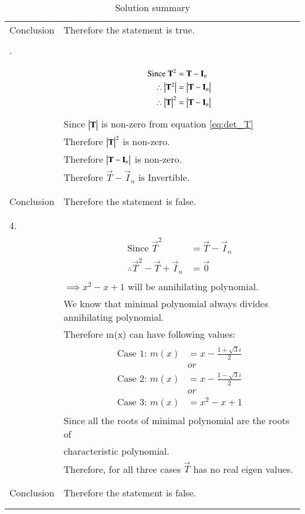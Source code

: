 \documentclass[journal,12pt]{IEEEtran}
\begin{document}
\begin{longtable}{|l|l|}
Conclusion&Therefore the statement is true.\\
&\\
\hline
\pagebreak
\hline
3.&\\
&\\
&\parbox{10cm}{\begin{align}
    \mbox{Since }\mathbf{T}^2&=\mathbf{T}-\mathbf{I}_{n}\\
    \therefore\begin{vmatrix}\mathbf{T}^2\end{vmatrix}&=\begin{vmatrix}\mathbf{T}-\mathbf{I}_{n}\end{vmatrix}\\
    \therefore\begin{vmatrix}\mathbf{T}\end{vmatrix}^2&=\begin{vmatrix}\mathbf{T}-\mathbf{I}_{n}\end{vmatrix}
\end{align}}\\
&Since $\begin{vmatrix}\mathbf{T}\end{vmatrix}$ is non-zero from equation \eqref{eq:det_T}\\
&Therefore $\begin{vmatrix}\mathbf{T}\end{vmatrix}^2$ is non-zero.\\
&Therefore $\begin{vmatrix}\mathbf{T}-\mathbf{I}_{n}\end{vmatrix}$ is non-zero.\\
&Therefore $\vec{T}-\vec{I}_{n}$ is Invertible.\\
&\\
\hline
&\\
Conclusion&Therefore the statement is false.\\
&\\
\hline
&\\
4.&\\
&\parbox{6cm}{\begin{align*}
    \mbox{Since }\vec{T}^2&=\vec{T}-\vec{I}_{n}\\
    \therefore\vec{T}^2-\vec{T}+\vec{I}_{n}&=\vec{0}
\end{align*}}\\
&$\implies x^2-x+1$ will be annihilating polynomial.\\
&We know that minimal polynomial always divides annihilating polynomial.\\
&Therefore m(x) can have following values:\\
&\parbox{6cm}{\begin{align*}
    \mbox{Case 1: }m(x)&=x-\frac{1+\sqrt{3}i}{2}\\
    &or\\
    \mbox{Case 2: }m(x)&=x-\frac{1-\sqrt{3}i}{2}\\
    &or\\
    \mbox{Case 3: }m(x)&=x^2-x+1
\end{align*}}\\
&Since all the roots of minimal polynomial are the roots of\\
&characteristic polynomial.\\
&Therefore, for all three cases $\vec{T}$ has no real eigen values.\\
&\\
\hline
&\\
Conclusion&Therefore the statement is false.\\
&\\
\hline
\caption{Solution summary}
\label{table:2}
\end{longtable}
\end{document}
